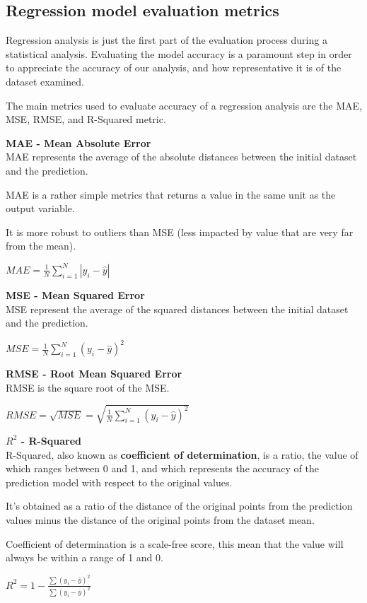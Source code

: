 \documentclass{article}
\begin{document}
\subsection{Regression model evaluation metrics}
Regression analysis is just the first part of the evaluation process during a statistical analysis. Evaluating the model accuracy is a paramount step in order to appreciate the accuracy of our analysis, and how representative it is of the dataset examined.

The main metrics used to evaluate accuracy of a regression analysis are the MAE, MSE, RMSE, and R-Squared metric.

\textbf{MAE - Mean Absolute Error} \\ 
MAE represents the average of the absolute distances between the initial dataset and the prediction.

MAE is a rather simple metrics that returns a value in the same unit as the output variable. 

It is more robust to outliers than MSE (less impacted by value that are very far from the mean).

$ \displaystyle MAE = \frac{1}{N} \sum^{N}_{i=1}{|y_i - \hat{y}|} $

\textbf{MSE - Mean Squared Error} \\
MSE represent the average of the squared distances between the initial dataset and the prediction.

$ \displaystyle MSE = \frac{1}{N} \sum^{N}_{i=1}{(y_i - \hat{y})^2} $

\textbf{RMSE - Root Mean Squared Error} \\
RMSE is the square root of the MSE.

$ \displaystyle RMSE = \sqrt{MSE} = \sqrt{\frac{1}{N} \sum^{N}_{i=1}{(y_i - \hat{y})^2}} $

\textbf{$R^2$ - R-Squared} \\
R-Squared, also known as \textbf{coefficient of determination}, is a ratio, the value of which ranges between 0 and 1, and which represents the accuracy of the prediction model with respect to the original values. 

It's obtained as a ratio of the distance of the original points from the prediction values minus the distance of the original points from the dataset mean. 

Coefficient of determination is a scale-free score, this mean that the value will always be within a range of 1 and 0.

$ \displaystyle R^2 = 1 - \frac{\sum(y_i - \hat{y})^2}{\sum(y_i - \bar{y})^2}$
\end{document}
